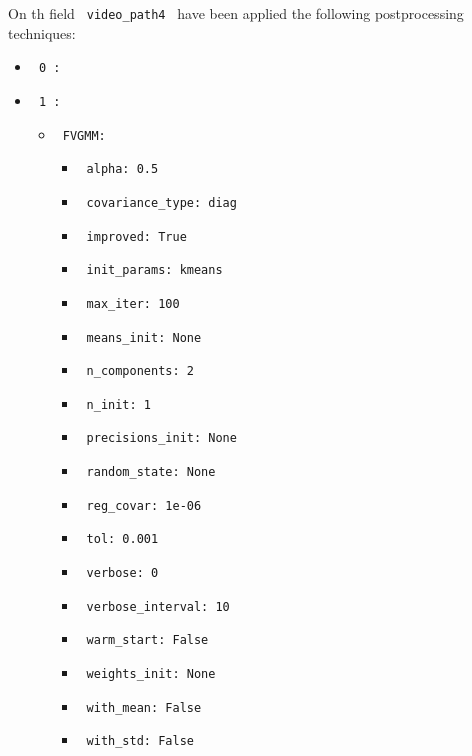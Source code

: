 \documentclass[11pt]{article}
\begin{document}
On th field \verb| video_path4 | have been applied the following postprocessing techniques:
\begin{itemize}
    \item
     \verb| 0 :|
     \begin{itemize}
           \end{itemize}
    \item
     \verb| 1 :|
     \begin{itemize}
             \item
            \verb| FVGMM: |

                   \begin{itemize}
                                    \item
                        \verb| alpha: 0.5 |
                                    \item
                        \verb| covariance_type: diag |
                                    \item
                        \verb| improved: True |
                                    \item
                        \verb| init_params: kmeans |
                                    \item
                        \verb| max_iter: 100 |
                                    \item
                        \verb| means_init: None |
                                    \item
                        \verb| n_components: 2 |
                                    \item
                        \verb| n_init: 1 |
                                    \item
                        \verb| precisions_init: None |
                                    \item
                        \verb| random_state: None |
                                    \item
                        \verb| reg_covar: 1e-06 |
                                    \item
                        \verb| tol: 0.001 |
                                    \item
                        \verb| verbose: 0 |
                                    \item
                        \verb| verbose_interval: 10 |
                                    \item
                        \verb| warm_start: False |
                                    \item
                        \verb| weights_init: None |
                                    \item
                        \verb| with_mean: False |
                                    \item
                        \verb| with_std: False |
                            \end{itemize}
       

\end{itemize}
\end{itemize}
\end{document}
